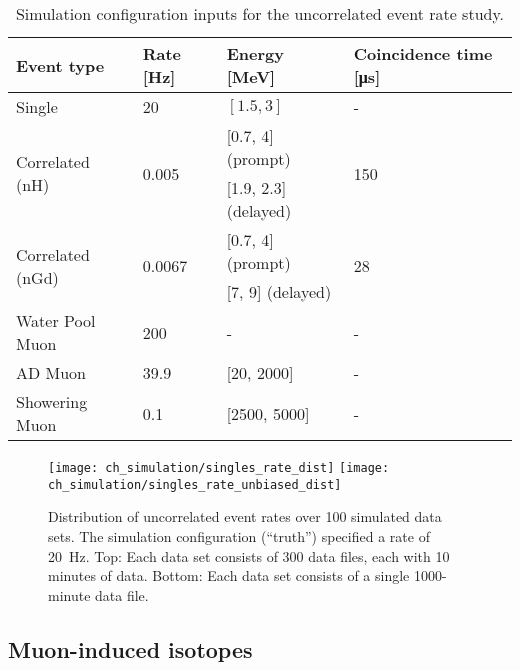 \begin{table}[ht]
    \centering
    \begin{tabular}[t]{llll}
        \hline
        Event type & {Rate [\si{\Hz}]} & Energy [\si{\MeV}] & Coincidence time [\si{\us}]\\
        \hline
        Single & \num{20} & $[\num{1.5}, \num{3}]$ & -\\
        \multirow{2}{*}{Correlated (nH)}
               & \multirow{2}{*}{\num{0.005}}
               & [\num{0.7}, \num{4}] (prompt)
               & \multirow{2}{*}{\num{150}} \\
               & & [\num{1.9}, \num{2.3}] (delayed) & \\
        \multirow{2}{*}{Correlated (nGd)}
               & \multirow{2}{*}{\num{0.0067}}
               & [\num{0.7}, \num{4}] (prompt)
               & \multirow{2}{*}{\num{28}} \\
               & & [\num{7}, \num{9}] (delayed) & \\
        Water Pool Muon & \num{200} & - & - \\
        AD Muon & \num{39.9} & [\num{20}, \num{2000}] & -\\
        Showering Muon & \num{0.1} & [\num{2500}, \num{5000}] & -\\
    \end{tabular}
    \caption{Simulation configuration inputs for the uncorrelated event rate study.}
    \label{tab:toymc_singles_config}
\end{table}

\begin{figure}
    \centering
    \texttt{[image: ch\_simulation/singles\_rate\_dist]}
    \texttt{[image: ch\_simulation/singles\_rate\_unbiased\_dist]}
    \caption{
        Distribution of uncorrelated event rates over 100 simulated data sets.
        The simulation configuration (``truth'') specified a rate of \SI{20}{\Hz}.
        Top: Each data set consists of 300 data files, each with 10 minutes of data.
        Bottom: Each data set consists of a single 1000-minute data file.
    }
    \label{fig:toymc_singles_dist}
\end{figure}

\subsection{Muon-induced isotopes}
\label{subsec:toymc_li9}


